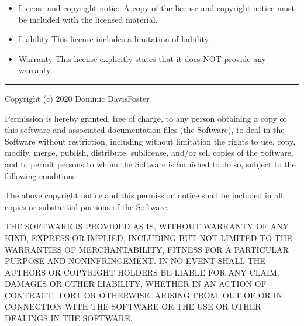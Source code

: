\documentclass[letterpaper,10pt,english]{sphinxmanual}
\begin{document}
\vspace{10px}

\begin{itemize}
\item {}
License and copyright notice \textendash{} A copy of the license and copyright notice must be included with the licensed material.

\end{itemize}

\vspace{10px}

\begin{itemize}
\item {}
Liability \textendash{} This license includes a limitation of liability.

\item {}
Warranty \textendash{} This license explicitly states that it does NOT provide any warranty.

\end{itemize}

\begin{flushright}



\end{flushright}


\bigskip\hrule\bigskip




\begin{sphinxVerbatim}[commandchars=\\\{\}]
Copyright (c) 2020 Dominic Davis\PYGZhy{}Foster

Permission is hereby granted, free of charge, to any person obtaining a copy
of this software and associated documentation files (the \PYGZdq{}Software\PYGZdq{}), to deal
in the Software without restriction, including without limitation the rights
to use, copy, modify, merge, publish, distribute, sublicense, and/or sell
copies of the Software, and to permit persons to whom the Software is
furnished to do so, subject to the following conditions:

The above copyright notice and this permission notice shall be included in all
copies or substantial portions of the Software.

THE SOFTWARE IS PROVIDED \PYGZdq{}AS IS\PYGZdq{}, WITHOUT WARRANTY OF ANY KIND,
EXPRESS OR IMPLIED, INCLUDING BUT NOT LIMITED TO THE WARRANTIES OF
MERCHANTABILITY, FITNESS FOR A PARTICULAR PURPOSE AND NONINFRINGEMENT.
IN NO EVENT SHALL THE AUTHORS OR COPYRIGHT HOLDERS BE LIABLE FOR ANY CLAIM,
DAMAGES OR OTHER LIABILITY, WHETHER IN AN ACTION OF CONTRACT, TORT OR
OTHERWISE, ARISING FROM, OUT OF OR IN CONNECTION WITH THE SOFTWARE OR THE USE
OR OTHER DEALINGS IN THE SOFTWARE.
\end{sphinxVerbatim}




\renewcommand{\indexname}{Index}
\printindex
\end{document}
